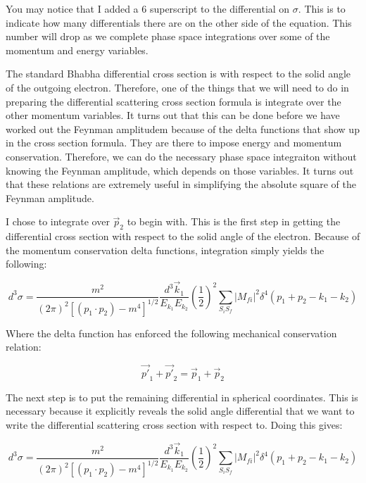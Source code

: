 \documentclass[a4]{article}
\begin{document}
    You may notice that I added a 6 superscript to the differential on $\sigma$. This is to indicate how many differentials there are on the other side of the equation. This number will drop as we 
    complete phase space integrations over some of the momentum and energy variables.

    The standard Bhabha differential cross section is with respect to the solid angle of the outgoing electron. Therefore, one of the things that we will need to do in preparing the differential 
    scattering cross section formula is integrate over the other momentum variables. It turns out that this can be done before we have worked out the Feynman amplitudem because of the delta functions that
    show up in the cross section formula. They are there to impose energy and momentum conservation. Therefore, we can do the necessary phase space integraiton without knowing the Feynman amplitude, which
    depends on those variables. It turns out that these relations are extremely useful in simplifying the absolute square of the Feynman amplitude.

    I chose to integrate over $\vec{p}_2$ to begin with. This is the first step in getting the differential cross section with respect to the solid angle of the electron. Because of the momentum conservation
    delta functions, integration simply yields the following:

    \begin{equation}
        d^3 \sigma = \frac{m^2}{(2 \pi)^2 [(p_1 \cdot p_2) - m^4]^{1/2}} \frac{d^3 \vec{k}_1}{E_{k_1} E_{k_2}} (\frac{1}{2})^2 \sum_{S_i S_f} |M_{fi}|^2 \delta^4 (p_1 + p_2 - k_1 - k_2)
    \end{equation}

    Where the delta function has enforced the following mechanical conservation relation:

    \begin{equation}
        \vec{p'}_1 + \vec{p'}_2 = \vec{p}_1 + \vec{p}_2
    \end{equation}

    The next step is to put the remaining differential in spherical coordinates. This is necessary because it explicitly reveals the solid angle differential that we want to write the differential scattering
    cross section with respect to. Doing this gives:

    \begin{equation}
        d^3 \sigma = \frac{m^2}{(2 \pi)^2 [(p_1 \cdot p_2) - m^4]^{1/2}} \frac{d^3 \vec{k}_1}{E_{k_1} E_{k_2}} (\frac{1}{2})^2 \sum_{S_i S_f} |M_{fi}|^2 \delta^4 (p_1 + p_2 - k_1 - k_2)
    \end{equation}
\end{document}
